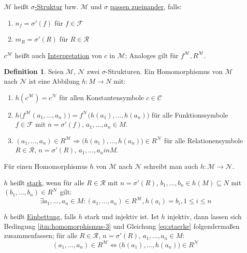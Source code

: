 \documentclass{article}
\theoremstyle{definition}
\newtheorem{dfn}{Definition}
\newcommand{\calC}{\mathcal{C}}
\newcommand{\calF}{\mathcal{F}}
\newcommand{\calM}{\mathcal{M}}
\newcommand{\calN}{\mathcal{N}}
\newcommand{\calR}{\mathcal{R}}
\begin{document}
    $ \calM $ heißt \underline{$ \sigma $-Struktur} bzw. $ \calM $ und $ \sigma $ \underline{passen zueinander}, falls:
    \begin{enumerate}
        \item $ n_f = \sigma'(f) $ für $ f \in \calF $
        \item $ m_R = \sigma'(R) $ für $ R \in \calR $
    \end{enumerate}

    $ c^\calM $ heißt auch \underline{Interpretation} von $ c $ in $ \calM $; Analoges gilt für $ f^\calM, R^\calM $.

    \begin{dfn}
        Seien $ \calM $, $ \calN $ zwei $ \sigma $-Strukturen.
        Ein Homomorphismus von $ \calM $ nach $ \calN $ ist eine Abbilung $ h : M \rightarrow N $ mit:
        \begin{enumerate}
            \item $ h(c^\calM) = c^\calN $ für allen Konstantensymbole $ c \in \calC $
            \item $ h\big(f^\calM(a_1, ..., a_n)\big) = f^\calN\big(h(a_1), ..., h(a_n)\big) $ für alle Funktionssymbole $ f \in \calF $ mit $ n = \sigma'(f) $, $ a_1, ..., a_n \in M $.
            \item \label{itm:homomorphismus-3} $ (a_1, ..., a_n) \in R^\calM \Rightarrow \big(h(a_1), ..., h(a_n)) \in R^\calN $ für alle Relationensymbole $ R \in \calR $, $ n = \sigma'(R) $, $ a_1, ..., a_n in M $.
        \end{enumerate}
    \end{dfn}

    Für einen Homomorphismus $ h $ von $ \calM $ nach $ \calN $ schreibt man auch $ h : \calM \rightarrow \calN $.

    $ h $ heißt \underline{stark}, wenn für alle $ R \in \calR $ mit $ n = \sigma'(R) $, $ b_1, ..., b_n \in h(M) \subseteq N $ mit $ (b_1, ..., b_n) \in R^\calN $ gilt:
    \begin{equation}
        \label{eq:staerke}
        \exists a_1, ..., a_n \in M : (a_1, ..., a_n) \in R^\calM, h(a_i) = b_i, 1 \leq i \leq n
    \end{equation}

    $ h $ heißt \underline{Einbettung}, falls $ h $ stark und injektiv ist.
    Ist $ h $ injektiv, dann lassen sich Bedingung \ref{itm:homomorphismus-3} und Gleichung \eqref{eq:staerke} folgendermaßen zusammenfassen; für alle $ R \in \calR $, $ n = \sigma'(R) $, $ a_1, ..., a_n \in M $:
    \begin{equation}
        (a_1, ..., a_n) \in R^\calM \Leftrightarrow \big(h(a_1), ..., h(a_n)\big) \in R^\calN
    \end{equation}
\end{document}
